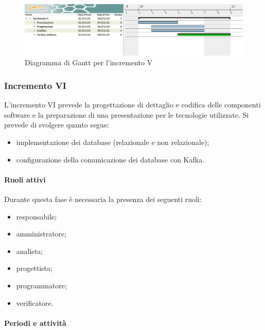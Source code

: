 		\begin{landscape}
          \begin{figure}[H]
            \centering
            \includegraphics[width=\linewidth]{images/gantt/incrementoV} %
            \caption{Diagramma di Gantt per l'incremento V}
          \end{figure}		
		\end{landscape}


		\subsubsection{Incremento VI}
			
			L'incremento VI prevede la progettazione di dettaglio e codifica delle componenti software e la preparazione di una presentazione per le tecnologie utilizzate. Si prevede di svolgere quanto segue:
			\begin{itemize}
				\item implementazione dei database (relazionale e non relazionale);
				\item configurazione della comunicazione dei database con Kafka.
			\end{itemize}
			
			\paragraph{Ruoli attivi}
			
				Durante questa fase è necessaria la presenza dei seguenti ruoli:
				\begin{itemize}
					\item responsabile;
					\item amministratore;
					\item analista;
					\item progettista;
					\item programmatore;
					\item verificatore.
				\end{itemize}
			
			\paragraph{Periodi e attività}
			
